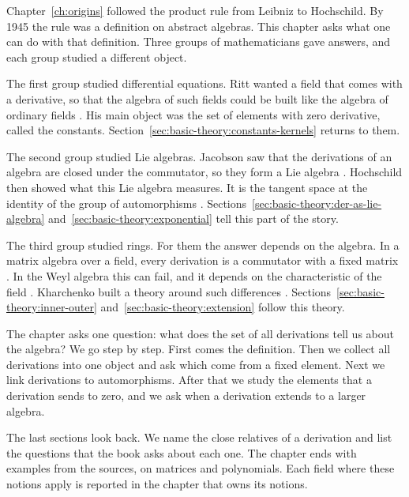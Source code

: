 
Chapter~\ref{ch:origins} followed the product rule from Leibniz to Hochschild.
By 1945 the rule was a definition on abstract algebras. This chapter asks what
one can do with that definition. Three groups of mathematicians gave answers,
and each group studied a different object.

The first group studied differential equations. Ritt wanted a field that comes
with a derivative, so that the algebra of such fields could be built like the
algebra of ordinary fields \cite[p.~1]{Ritt1950}. His main object was the set
of elements with zero derivative, called the constants.
Section~\ref{sec:basic-theory:constants-kernels} returns to them.

The second group studied Lie algebras. Jacobson saw that the derivations of an
algebra are closed under the commutator, so they form a Lie algebra
\cite[p.~207]{Jacobson1937}. Hochschild then showed what this Lie algebra
measures. It is the tangent space at the identity of the group of
automorphisms \cite[pp.~677--678]{Hochschild1942}.
Sections~\ref{sec:basic-theory:der-as-lie-algebra}
and~\ref{sec:basic-theory:exponential} tell this part of the story.

The third group studied rings. For them the answer depends on the algebra.
In a matrix algebra over a field, every derivation is a commutator with a fixed
matrix \cite[Corollary~6.2]{BresarHanselkaKlepVolcic2018}. In the Weyl algebra
this can fail, and it depends on the characteristic of the field
\cite[p.~48]{BenkartLopesOndrus2015}. Kharchenko built a theory around such
differences \cite{Kharchenko1991}. Sections~\ref{sec:basic-theory:inner-outer}
and~\ref{sec:basic-theory:extension} follow this theory.

The chapter asks one question: what does the set of all derivations tell us
about the algebra? We go step by step. First comes the definition. Then we
collect all derivations into one object and ask which come from a fixed
element. Next we link derivations to automorphisms. After that we study the
elements that a derivation sends to zero, and we ask when a derivation extends
to a larger algebra.

The last sections look back. We name the close relatives of a derivation and
list the questions that the book asks about each one. The chapter ends with examples from the sources, on
matrices and polynomials.
Each field where these notions apply is reported in the chapter that owns its
notions.

